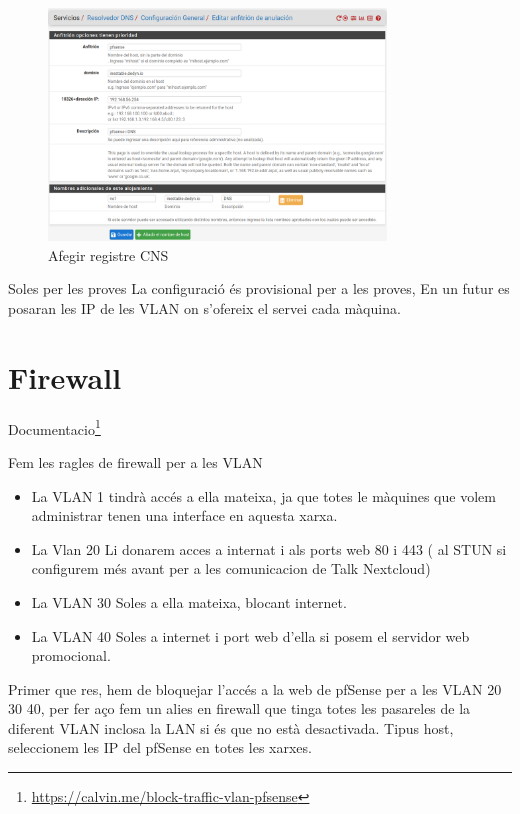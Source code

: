 \documentclass[
  10pt,
]{krantz}
\DeclareRobustCommand{\href}[2]{#2\footnote{\url{#1}}}
\begin{document}
\begin{figure}
\centering
\includegraphics[width=0.8\textwidth,height=\textheight]{imatges/proxmox/DNS3.png}
\caption{Afegir registre CNS}
\end{figure}

\begin{rmdcuidao}{Soles per les proves}
La configuració és provisional per a les proves, En un futur es posaran les IP de les VLAN on s'ofereix el servei cada màquina.

\end{rmdcuidao}

\hypertarget{firewall}{%
\section{Firewall}\label{firewall}}

\href{https://calvin.me/block-traffic-vlan-pfsense}{Documentacio}

Fem les ragles de firewall per a les VLAN

\begin{itemize}
\item
  La VLAN 1 tindrà accés a ella mateixa, ja que totes le màquines que volem administrar tenen una interface en aquesta xarxa.
\item
  La Vlan 20 Li donarem acces a internat i als ports web 80 i 443 ( al STUN si configurem més avant per a les comunicacion de Talk Nextcloud)
\item
  La VLAN 30 Soles a ella mateixa, blocant internet.
\item
  La VLAN 40 Soles a internet i port web d'ella si posem el servidor web promocional.
\end{itemize}

Primer que res, hem de bloquejar l'accés a la web de pfSense per a les VLAN 20 30 40, per fer aço fem un alies en firewall que tinga totes les pasareles de la diferent VLAN inclosa la LAN si és que no està desactivada. Tipus host, seleccionem les IP del pfSense en totes les xarxes.
\end{document}
